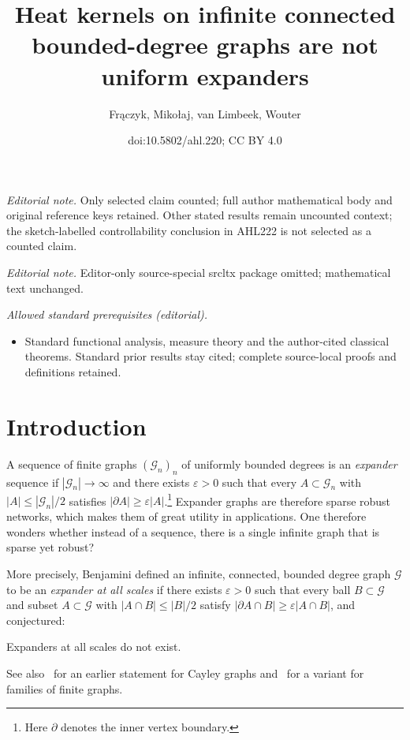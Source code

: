 \documentclass[10pt]{amsart}
\title{Heat kernels on infinite connected bounded-degree graphs are not uniform expanders}
\author{Frączyk, Mikołaj, van Limbeek, Wouter}
\date{doi:10.5802/ahl.220; CC BY 4.0}
\theoremstyle{definition}\newtheorem{defi}[theo]{Definition}\newtheorem{rema}[theo]{Remark}\newtheorem{exam}[theo]{Example}\newtheorem{exem}[theo]{Example}\newtheorem{nota}[theo]{Notation}
\newcommand{\calG}{\mathcal{G}}
\begin{document}
\maketitle
\noindent\textit{Editorial note.} Only selected claim counted; full author mathematical body and original reference keys retained. Other stated results remain uncounted context; the sketch-labelled controllability conclusion in AHL222 is not selected as a counted claim.\par\medskip
\noindent\textit{Editorial note.} Editor-only source-special srcltx package omitted; mathematical text unchanged.\par\medskip
\noindent\textit{Allowed standard prerequisites (editorial).}\begin{itemize}
\item Standard functional analysis, measure theory and the author-cited classical theorems. Standard prior results stay cited; complete source-local proofs and definitions retained.
\end{itemize}\medskip


\section{Introduction}\label{sec:intro}

A sequence of finite graphs $(\calG_n)_n$ of uniformly bounded degrees is an \emph{expander} sequence if $|\calG_n|\to\infty$ and there exists $\varepsilon>0$ such that every $A\subset \calG_n$ with $|A|\leq |\calG_n|/2$ satisfies $|\partial A|\geq \varepsilon |A|$.\footnote{Here $\partial$ denotes the inner vertex boundary.} Expander graphs are therefore sparse robust networks, which makes them of great utility in applications. One therefore wonders whether instead of a sequence, there is a single infinite graph that is sparse yet robust?

More precisely, Benjamini defined an infinite, connected, bounded degree graph $\calG$ to be an \emph{expander at all scales} if there exists $\varepsilon>0$ such that every ball $B\subset \calG$ and subset $A\subset \calG$ with $|A\cap B|\leq |B|/2$ satisfy $|\partial A\cap B|\geq \varepsilon |A\cap B|$, and conjectured:


\begin{conj}\label{conj:benjamini}
Expanders at all scales do not exist.
\end{conj}

See also~\cite{Benjamini1998} for an earlier statement for Cayley graphs and~\cite{BenjaminiErdos} for a variant for families of finite graphs.
\end{document}
